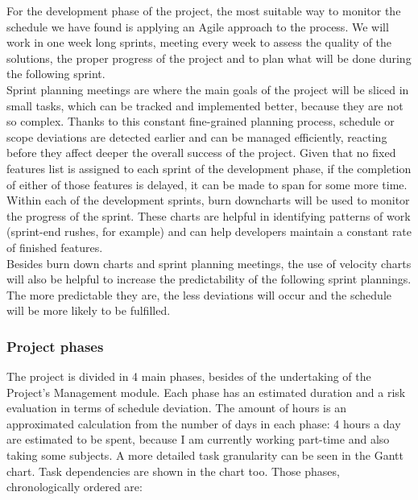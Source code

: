 For the development phase of the project, the most suitable way to monitor the schedule we have found is applying an Agile approach to the process. We will work in one week long sprints, meeting every week to assess the quality of the solutions, the proper progress of the project and to plan what will be done during the following sprint.\\

Sprint planning meetings are where the main goals of the project will be sliced in small tasks, which can be tracked and implemented better, because they are not so complex. Thanks to this constant fine-grained planning process, schedule or scope deviations are detected earlier and can be managed efficiently, reacting before they affect deeper the overall success of the project. Given that no fixed features list is assigned to each sprint of the development phase, if the completion of either of those features is delayed, it can be made to span for some more time.\\

Within each of the development sprints, burn downcharts will be used to monitor the progress of the sprint. These charts are helpful in identifying patterns of work (sprint-end rushes, for example) and can help developers maintain a constant rate of finished features.\\

Besides burn down charts and sprint planning meetings, the use of velocity charts will also be helpful to increase the predictability of the following sprint plannings. The more predictable they are, the less deviations will occur and the schedule will be more likely to be fulfilled.

\subsubsection{Project phases}

The project is divided in 4 main phases, besides of the undertaking of the Project's Management module. Each phase has an estimated duration and a risk evaluation in terms of schedule deviation. The amount of hours is an approximated calculation from the number of days in each phase: 4 hours a day are estimated to be spent, because I am currently working part-time and also taking some subjects. A more detailed task granularity can be seen in the Gantt chart. Task dependencies are shown in the chart too. Those phases, chronologically ordered are:

